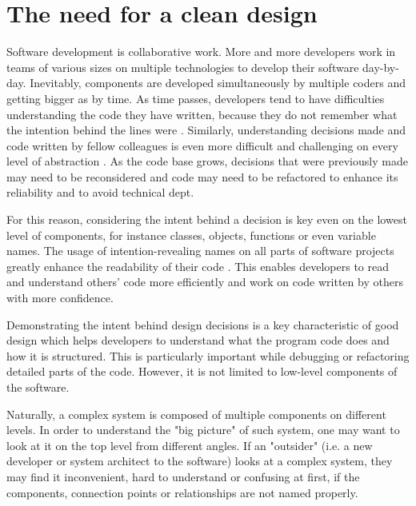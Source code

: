 \documentclass[conference]{IEEEtran}
\begin{document}
\section{The need for a clean design}
Software development is collaborative work. More and more developers work in teams of various sizes on multiple technologies to develop their software day-by-day. Inevitably, components are developed simultaneously by multiple coders and getting bigger as by time. As time passes, developers tend to have difficulties understanding the code they have written, because they do not remember what the intention behind the lines were \cite{cleancoder}. Similarly, understanding decisions made and code written by fellow colleagues is even more difficult and challenging on every level of abstraction \cite{cleancoder}. As the code base grows, decisions that were previously made may need to be reconsidered and code may need to be refactored to enhance its reliability and to avoid technical dept. 

For this reason, considering the intent behind a decision is key even on the lowest level of components, for instance classes, objects, functions or even variable names. The usage of intention-revealing names on all parts of software projects greatly enhance the readability of their code \cite{cleancode}. This enables developers to read and understand others' code more efficiently and work on code written by others with more confidence. 

Demonstrating the intent behind design decisions is a key characteristic of good design which helps developers to understand what the program code does and how it is structured. This is particularly important while debugging or refactoring detailed parts of the code. However, it is not limited to low-level components of the software. 

Naturally, a complex system is composed of multiple components on different levels. In order to understand the "big picture" of such system, one may want to look at it on the top level from different angles. If an "outsider" (i.e. a new developer or system architect to the software) looks at a complex system, they may find it inconvenient, hard to understand or confusing at first, if the components, connection points or relationships are not named properly. 
\end{document}

